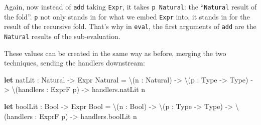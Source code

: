 \documentclass[]{article}
\newenvironment{Shaded}{}{}
\newcommand{\CommentTok}[1]{\textcolor[rgb]{0.38,0.63,0.69}{\textit{#1}}}
\newcommand{\KeywordTok}[1]{\textcolor[rgb]{0.00,0.44,0.13}{\textbf{#1}}}
\newcommand{\NormalTok}[1]{#1}
\newcommand{\OperatorTok}[1]{\textcolor[rgb]{0.40,0.40,0.40}{#1}}
\begin{document}
Again, now instead of \texttt{add} taking \texttt{Expr}, it takes
\texttt{p\ Natural}: the ``\texttt{Natural} result of the fold''. \texttt{p} not
only stands in for what we embed \texttt{Expr} into, it stands in for the result
of the recursive fold. That's why in \texttt{eval}, the first arguments of
\texttt{add} are the \texttt{Natural} results of the sub-evaluation.

These values can be created in the same way as before, merging the two
techniques, sending the handlers downstream:

\begin{Shaded}
\begin{Highlighting}[]
\KeywordTok{let}\CommentTok{ }\NormalTok{natLit}
\CommentTok{    }\NormalTok{:}\CommentTok{ }\NormalTok{Natural}\CommentTok{ }\OperatorTok{{-}\textgreater{}}\CommentTok{ }\NormalTok{Expr}\CommentTok{ }\NormalTok{Natural}
\CommentTok{    }\NormalTok{=}\CommentTok{ }\OperatorTok{\textbackslash{}}\NormalTok{(n}\CommentTok{ }\NormalTok{:}\CommentTok{ }\NormalTok{Natural)}\CommentTok{ }\OperatorTok{{-}\textgreater{}}
\CommentTok{      }\OperatorTok{\textbackslash{}}\NormalTok{(p}\CommentTok{ }\NormalTok{:}\CommentTok{ }\NormalTok{Type}\CommentTok{ }\OperatorTok{{-}\textgreater{}}\CommentTok{ }\NormalTok{Type)}\CommentTok{ }\OperatorTok{{-}\textgreater{}}
\CommentTok{      }\OperatorTok{\textbackslash{}}\NormalTok{(handlers}\CommentTok{ }\NormalTok{:}\CommentTok{ }\NormalTok{ExprF}\CommentTok{ }\NormalTok{p)}\CommentTok{ }\OperatorTok{{-}\textgreater{}}
\CommentTok{        }\NormalTok{handlers.natLit}\CommentTok{ }\NormalTok{n}

\KeywordTok{let}\CommentTok{ }\NormalTok{boolLit}
\CommentTok{    }\NormalTok{:}\CommentTok{ }\NormalTok{Bool}\CommentTok{ }\OperatorTok{{-}\textgreater{}}\CommentTok{ }\NormalTok{Expr}\CommentTok{ }\NormalTok{Bool}
\CommentTok{    }\NormalTok{=}\CommentTok{ }\OperatorTok{\textbackslash{}}\NormalTok{(n}\CommentTok{ }\NormalTok{:}\CommentTok{ }\NormalTok{Bool)}\CommentTok{ }\OperatorTok{{-}\textgreater{}}
\CommentTok{      }\OperatorTok{\textbackslash{}}\NormalTok{(p}\CommentTok{ }\NormalTok{:}\CommentTok{ }\NormalTok{Type}\CommentTok{ }\OperatorTok{{-}\textgreater{}}\CommentTok{ }\NormalTok{Type)}\CommentTok{ }\OperatorTok{{-}\textgreater{}}
\CommentTok{      }\OperatorTok{\textbackslash{}}\NormalTok{(handlers}\CommentTok{ }\NormalTok{:}\CommentTok{ }\NormalTok{ExprF}\CommentTok{ }\NormalTok{p)}\CommentTok{ }\OperatorTok{{-}\textgreater{}}
\CommentTok{        }\NormalTok{handlers.boolLit}\CommentTok{ }\NormalTok{n}


\end{Highlighting}
\end{Shaded}
\end{document}
